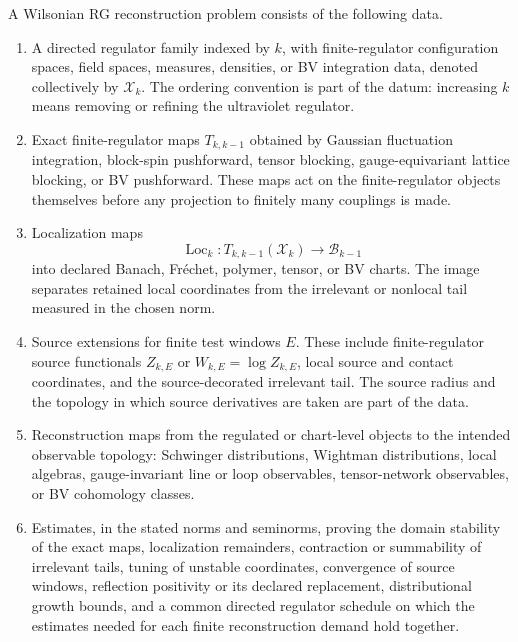 \begin{definition}
\label{def:wilsonian-rg-reconstruction-problem}
A Wilsonian RG reconstruction problem consists of the following data.
\begin{enumerate}
  \item A directed regulator family indexed by \(k\), with finite-regulator
  configuration spaces, field spaces, measures, densities, or BV integration
  data, denoted collectively by \(\mathcal X_k\).  The ordering convention is
  part of the datum: increasing \(k\) means removing or refining the ultraviolet
  regulator.
  \item Exact finite-regulator maps \(T_{k,k-1}\) obtained by Gaussian
  fluctuation integration, block-spin pushforward, tensor blocking,
  gauge-equivariant lattice blocking, or BV pushforward.  These maps act on the
  finite-regulator objects themselves before any projection to finitely many
  couplings is made.
  \item Localization maps
  \[
    \operatorname{Loc}_k:T_{k,k-1}(\mathcal X_k)\longrightarrow\mathcal B_{k-1}
  \]
  into declared Banach, Fr\'echet, polymer, tensor, or BV charts.  The image
  separates retained local coordinates from the irrelevant or nonlocal tail
  measured in the chosen norm.
  \item Source extensions for finite test windows \(E\).  These include
  finite-regulator source functionals \(Z_{k,E}\) or \(W_{k,E}=\log Z_{k,E}\),
  local source and contact coordinates, and the source-decorated irrelevant
  tail.  The source radius and the topology in which source derivatives are
  taken are part of the data.
  \item Reconstruction maps from the regulated or chart-level objects to the
  intended observable topology: Schwinger distributions, Wightman
  distributions, local algebras, gauge-invariant line or loop observables,
  tensor-network observables, or BV cohomology classes.
  \item Estimates, in the stated norms and seminorms, proving the domain
  stability of the exact maps, localization remainders, contraction or
  summability of irrelevant tails, tuning of unstable coordinates, convergence
  of source windows, reflection positivity or its declared replacement,
  distributional growth bounds, and a common directed regulator schedule on
  which the estimates needed for each finite reconstruction demand hold
  together.
\end{enumerate}
\end{definition}


